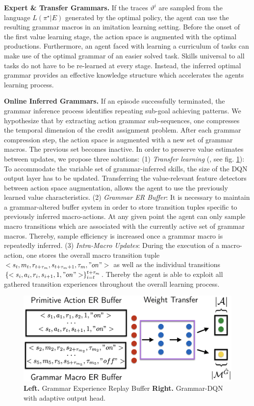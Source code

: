 \documentclass[10pt,letterpaper]{article}
\begin{document}
\textbf{Expert \& Transfer Grammars.} If the traces $\vartheta^i$ are sampled from the language $L(\pi^\star|E)$ generated by the optimal policy, the agent can use the resulting grammar macros in an imitation learning setting. Before the onset of the first value learning stage, the action space is augmented with the optimal productions. Furthermore, an agent faced with learning a curriculum of tasks can make use of the optimal grammar of an easier solved task. Skills universal to all tasks do not have to be re-learned at every stage. Instead, the inferred optimal grammar provides an effective knowledge structure which accelerates the agents learning process.

\textbf{Online Inferred Grammars.} If an episode successfully terminated, the grammar inference process identifies repeating sub-goal achieving patterns. We hypothesize that by extracting action grammar sub-sequences, one compresses the temporal dimension of the credit assignment problem. After each grammar compression step, the action space is augmented with a new set of grammar macros. The previous set becomes inactive. 
In order to preserve value estimates between updates, we propose three solutions:
(1) \textit{Transfer learning} (, see fig. \ref{fig:online_ag_dqn}): To accommodate the variable set of grammar-inferred skills, the size of the DQN output layer has to be updated. Transferring the value-relevant feature detectors between action space augmentation, allows the agent to use the previously learned value characteristics.
(2) \textit{Grammar ER Buffer}: It is necessary to maintain a grammar-altered buffer system in order to store transition tuples specific to previously inferred macro-actions. At any given point the agent can only sample macro transitions which are associated with the currently active set of grammar macros. Thereby, sample efficiency is increased once a grammar macro is repeatedly inferred.
(3) \textit{Intra-Macro Updates}: During the execution of a macro-action, one stores the overall macro transition tuple $<s_t,m_t,r_{t +\tau_m}, s_{t +\tau_m +1}, \tau_m, "on">$ as well as the individual transitions $\{<s_i,a_i,r_i, s_{i+1}, 1, "on">\}_{i=t}^{t + \tau_m}$. Thereby the agent is able to exploit all gathered transition experiences throughout the overall learning process.

\begin{figure}[H]
    \includegraphics[width=\linewidth]{figures/ag_dqn_buffer}
    \caption{\textbf{Left.} Grammar Experience Replay Buffer \textbf{Right.} Grammar-DQN with adaptive output head.}
  \label{fig:online_ag_dqn}
\end{figure}
    
\end{document}
